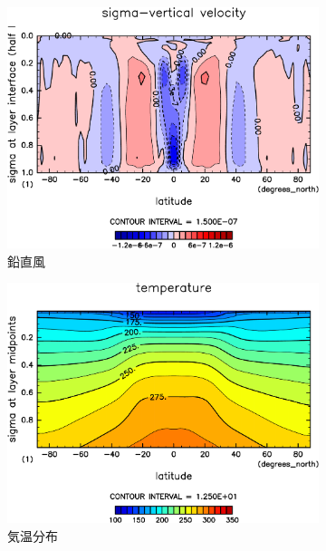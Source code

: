 \documentclass[body]{subfiles}
\begin{document}
\begin{figure}[t]
\begin{subfigure}{.4\textwidth}
		\includegraphics[width=\columnwidth]{S1366/SigDot,time=14600:14965-crop-rotate.pdf}
		\caption{鉛直風}\label{S1366鉛直風}
	\end{subfigure}
	\begin{subfigure}{.4\textwidth}
		\centering
		\includegraphics[width=\columnwidth]{S1366/Temp,time=14600:14965-crop-rotate.pdf}
		\caption{気温分布}\label{S1366気温分布}
	\end{subfigure}
	\begin{subfigure}{.4\textwidth}
		\centering

\end{subfigure}
\end{figure}
\end{document}
